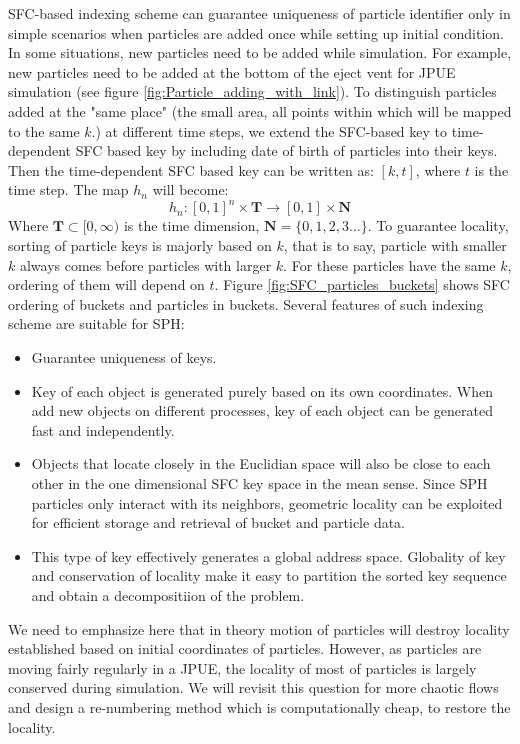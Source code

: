 \documentclass[conference,compsoc]{IEEEtran}
\begin{document}
SFC-based indexing scheme can guarantee uniqueness of particle identifier only in simple scenarios when particles are added once while setting up initial condition. In some situations, new particles need to be added while simulation. For example, new particles need to be added at the bottom of the eject vent for JPUE simulation (see figure \ref{fig:Particle_adding_with_link}). To distinguish particles added at the "same place" (the small area, all points within which will be mapped to the same $k$.) at different time steps, we extend the SFC-based key to time-dependent SFC based key by including date of birth of particles into their keys. Then the time-dependent SFC based key can be written as: $[k,t]$, where $t$ is the time step. The map $h_n$ will become:
\begin{equation}
h_n: [0,1]^n \times \textbf{T} \rightarrow [0,1] \times \textbf{N}
\end{equation}
Where $\textbf{T} \subset [0,\infty)$ is the time dimension, $\textbf{N}=\lbrace 0, 1, 2, 3...\rbrace$.
To guarantee locality, sorting of particle keys is majorly based on $k$, that is to say, particle with smaller $k$ always comes before particles with larger $k$. For these particles have the same $k$, ordering of them will depend on $t$. Figure \ref{fig:SFC_particles_buckets} shows SFC ordering of buckets and particles in buckets. 
Several features of such indexing scheme are suitable for SPH:
\begin{itemize}
\item Guarantee uniqueness of keys.
\item Key of each object is generated purely based on its own coordinates. When add new objects on different processes, key of each object can be generated fast and independently.
\item Objects that locate closely in the Euclidian space will also be close to each other in the one dimensional SFC key space in the mean sense. Since SPH particles only interact with its neighbors, geometric locality can be exploited for efficient storage and retrieval of bucket and particle data.
\item This type of key effectively generates a global address space. Globality of key and conservation of locality make it easy to partition the sorted key sequence and obtain a decompositiion of the problem.
\end{itemize}
We need to emphasize here that in theory motion of particles will destroy locality established based on initial coordinates of particles. However, as particles are moving fairly regularly in a JPUE, the locality of most of particles is largely conserved during simulation. We will revisit this question for more chaotic flows and 
design a re-numbering method which is computationally cheap, to restore the locality.
\end{document}
